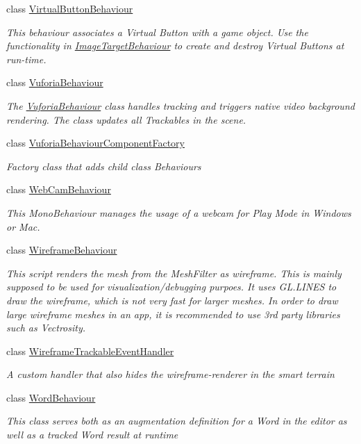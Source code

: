 \begin{DoxyCompactItemize}
class \hyperlink{class_vuforia_1_1_virtual_button_behaviour}{Virtual\+Button\+Behaviour}
\begin{DoxyCompactList}\small\item\em This behaviour associates a Virtual Button with a game object. Use the functionality in \hyperlink{class_vuforia_1_1_image_target_behaviour}{Image\+Target\+Behaviour} to create and destroy Virtual Buttons at run-\/time. \end{DoxyCompactList}\item 
class \hyperlink{class_vuforia_1_1_vuforia_behaviour}{Vuforia\+Behaviour}
\begin{DoxyCompactList}\small\item\em The \hyperlink{class_vuforia_1_1_vuforia_behaviour}{Vuforia\+Behaviour} class handles tracking and triggers native video background rendering. The class updates all Trackables in the scene. \end{DoxyCompactList}\item 
class \hyperlink{class_vuforia_1_1_vuforia_behaviour_component_factory}{Vuforia\+Behaviour\+Component\+Factory}
\begin{DoxyCompactList}\small\item\em Factory class that adds child class Behaviours \end{DoxyCompactList}\item 
class \hyperlink{class_vuforia_1_1_web_cam_behaviour}{Web\+Cam\+Behaviour}
\begin{DoxyCompactList}\small\item\em This Mono\+Behaviour manages the usage of a webcam for Play Mode in Windows or Mac. \end{DoxyCompactList}\item 
class \hyperlink{class_vuforia_1_1_wireframe_behaviour}{Wireframe\+Behaviour}
\begin{DoxyCompactList}\small\item\em This script renders the mesh from the Mesh\+Filter as wireframe. This is mainly supposed to be used for visualization/debugging purpoes. It uses G\+L.\+L\+I\+N\+E\+S to draw the wireframe, which is not very fast for larger meshes. In order to draw large wireframe meshes in an app, it is recommended to use 3rd party libraries such as Vectrosity. \end{DoxyCompactList}\item 
class \hyperlink{class_vuforia_1_1_wireframe_trackable_event_handler}{Wireframe\+Trackable\+Event\+Handler}
\begin{DoxyCompactList}\small\item\em A custom handler that also hides the wireframe-\/renderer in the smart terrain \end{DoxyCompactList}\item 
class \hyperlink{class_vuforia_1_1_word_behaviour}{Word\+Behaviour}
\begin{DoxyCompactList}\small\item\em This class serves both as an augmentation definition for a Word in the editor as well as a tracked Word result at runtime \end{DoxyCompactList}\end{DoxyCompactItemize}
